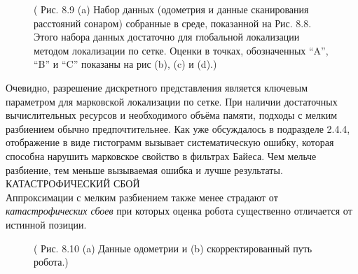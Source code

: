 \documentclass[10pt,a4paper]{article}
\begin{document}
\begin{figure}[H]
	\caption{ ( Рис. 8.9 (a) Набор данных (одометрия и данные сканирования расстояний сонаром) собранные в среде, показанной на Рис. 8.8. Этого набора данных достаточно для глобальной локализации методом локализации по сетке. Оценки в точках, обозначенных “A”, “B” и “C” показаны на рис (b), (c) и (d).)}
	\label{fig:89orig}
\end{figure}

Очевидно, разрешение дискретного представления является ключевым параметром для марковской локализации по сетке. При наличии достаточных вычислительных ресурсов и необходимого объёма памяти, подходы с мелким разбиением обычно предпочтительнее. Как уже обсуждалось в подразделе 2.4.4, отображение в виде гистограмм вызывает систематическую ошибку, которая способна нарушить марковское свойство в фильтрах Байеса. Чем мельче разбиение, тем меньше вызываемая ошибка и лучше результаты.\\
КАТАСТРОФИЧЕСКИЙ СБОЙ\\
 Аппроксимации с мелким разбиением также менее страдают от \textit{катастрофических сбоев} при которых оценка робота существенно отличается от истинной позиции.

\begin{figure}[H]
	\caption{ ( Рис. 8.10   (a) Данные одометрии и (b) скорректированный путь робота.)}
	\label{fig:810orig}
\end{figure}
\end{document}
